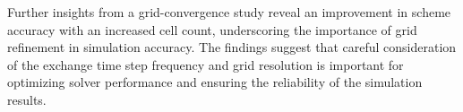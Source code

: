 





Further insights from a grid-convergence study reveal an improvement in scheme accuracy with an increased cell count, underscoring the importance of grid refinement in simulation accuracy. The findings suggest that careful consideration of the exchange time step frequency and grid resolution is important for optimizing solver performance and ensuring the reliability of the simulation results.

